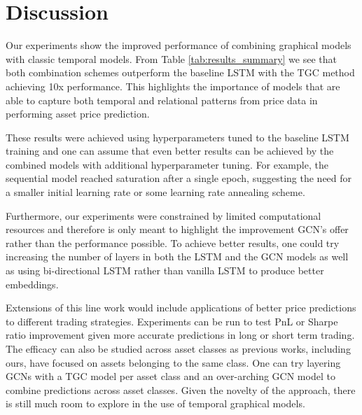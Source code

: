 \section{Discussion}

Our experiments show the improved performance of combining graphical models with classic temporal models. From Table \ref{tab:results_summary} we see that both combination schemes outperform the baseline LSTM with the TGC method achieving 10x performance. This highlights the importance of models that are able to capture both temporal and relational patterns from price data in performing asset price prediction.

These results were achieved using hyperparameters tuned to the baseline LSTM training and one can assume that even better results can be achieved by the combined models with additional hyperparameter tuning. For example, the sequential model reached saturation after a single epoch, suggesting the need for a smaller initial learning rate or some learning rate annealing scheme. 

Furthermore, our experiments were constrained by limited computational resources and therefore is only meant to highlight the improvement GCN's offer rather than the performance possible. To achieve better results, one could try increasing the number of layers in both the LSTM and the GCN models as well as using bi-directional LSTM rather than vanilla LSTM to produce better embeddings.

Extensions of this line work would include applications of better price predictions to different trading strategies. Experiments can be run to test PnL or Sharpe ratio improvement given more accurate predictions in long or short term trading. The efficacy can also be studied across asset classes as previous works, including ours, have focused on assets belonging to the same class. One can try layering GCNs with a TGC model per asset class and an over-arching GCN model to combine predictions across asset classes. Given the novelty of the approach, there is still much room to explore in the use of temporal graphical models.